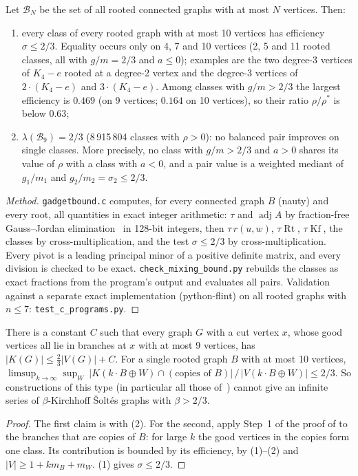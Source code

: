 \documentclass[11pt,a4paper]{report}
\newcommand*{\Kf}{\operatorname{Kf}}
\newcommand*{\Rt}{\operatorname{Rt}}
\newcommand*{\cB}{\mathcal{B}}
\begin{document}
\begin{proposition}[note=exact computation]\label{prop:lambda}
Let \(\cB_N\) be the set of all rooted connected graphs with at most \(N\) vertices. Then:
\begin{enumerate}
\item every class of every rooted graph with at most 10 vertices has efficiency \(\sigma\le2/3\). Equality
occurs only on 4, 7 and 10 vertices (2, 5 and 11 rooted classes, all with \(g/m=2/3\) and \(a\le0\)); examples are the
two degree-3 vertices of \(K_4-e\) rooted at a degree-2 vertex and the degree-3 vertices of \(2\cdot(K_4-e)\) and
\(3\cdot(K_4-e)\). Among classes with \(g/m>2/3\) the largest efficiency is \(0.469\) (on 9 vertices; \(0.164\) on 10
vertices), so their ratio \(\rho/\rho^*\) is below \(0.63\);
\item \(\lambda(\cB_9)=2/3\) (8\,915\,804 classes with \(\rho>0\)): no balanced pair improves on single classes. More precisely, no class with \(g/m>2/3\) and
\(a>0\) shares its value of \(\rho\) with a class with \(a<0\), and a pair value is a weighted mediant of \(g_1/m_1\)
and \(g_2/m_2=\sigma_2\le2/3\).
\end{enumerate}
\end{proposition}
\begin{proof}[Method]
\texttt{gadgetbound.c} computes, for every connected graph \(B\) (nauty) and every root, all quantities in exact integer
arithmetic: \(\tau\) and \(\operatorname{adj}A\) by fraction-free Gauss--Jordan elimination~\autocite{Bareiss1968} in
128-bit integers, then \(\tau\,r(u,w)\), \(\tau\Rt\), \(\tau\Kf\), the classes by cross-multiplication, and the test
\(\sigma\le2/3\) by cross-multiplication. Every pivot is a leading principal minor of a positive definite matrix, and
every division is checked to be exact. \texttt{check\_mixing\_bound.py} rebuilds the classes as exact fractions from
the program's output and evaluates all pairs. Validation against a separate exact implementation (python-flint) on
all rooted graphs with \(n\le7\): \texttt{test\_c\_programs.py}.
\end{proof}

\begin{corollary}\label{cor:barrier}
There is a constant \(C\) such that every graph \(G\) with a cut vertex \(x\), whose good vertices all lie in branches at
\(x\) with at most 9 vertices, has \(|K(G)|\le\frac23|V(G)|+C\). For a single rooted graph \(B\) with at most 10
vertices,
\(\limsup_{k\to\infty}\sup_W\ |K(k\cdot B\oplus W)\cap(\text{copies of }B)|\,/\,|V(k\cdot B\oplus W)|\le2/3\).
So constructions of this type (in particular all those of~\autocite{GMD2026,MG2025}) cannot give an infinite series of
\(\beta\)-Kirchhoff Šoltés graphs with \(\beta>2/3\).
\end{corollary}
\begin{proof}
The first claim is  with (2). For the second, apply Step~1 of the proof of
 to the branches that are copies of \(B\): for large \(k\) the good vertices in the copies form one
class. Its contribution is bounded by its efficiency, by (1)--(2) and \(|V|\ge1+km_B+m_W\).
(1) gives \(\sigma\le2/3\).
\end{proof}
\end{document}
